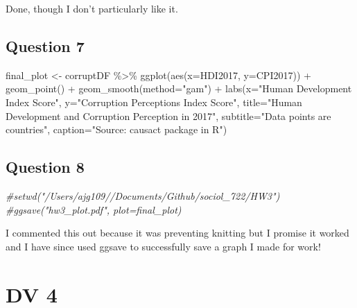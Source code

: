 \documentclass[
]{article}
\newenvironment{Shaded}{\begin{snugshade}}{\end{snugshade}}
\newcommand{\AttributeTok}[1]{\textcolor[rgb]{0.77,0.63,0.00}{#1}}
\newcommand{\CommentTok}[1]{\textcolor[rgb]{0.56,0.35,0.01}{\textit{#1}}}
\newcommand{\FunctionTok}[1]{\textcolor[rgb]{0.00,0.00,0.00}{#1}}
\newcommand{\NormalTok}[1]{#1}
\newcommand{\OtherTok}[1]{\textcolor[rgb]{0.56,0.35,0.01}{#1}}
\newcommand{\SpecialCharTok}[1]{\textcolor[rgb]{0.00,0.00,0.00}{#1}}
\newcommand{\StringTok}[1]{\textcolor[rgb]{0.31,0.60,0.02}{#1}}
\begin{document}
Done, though I don't particularly like it.

\hypertarget{question-7}{%
\subsection{Question 7}\label{question-7}}

\begin{Shaded}
\begin{Highlighting}[]
\NormalTok{final\_plot }\OtherTok{\textless{}{-}}\NormalTok{ corruptDF }\SpecialCharTok{\%\textgreater{}\%} 
  \FunctionTok{ggplot}\NormalTok{(}\FunctionTok{aes}\NormalTok{(}\AttributeTok{x=}\NormalTok{HDI2017,}
             \AttributeTok{y=}\NormalTok{CPI2017)) }\SpecialCharTok{+}
  \FunctionTok{geom\_point}\NormalTok{() }\SpecialCharTok{+}
  \FunctionTok{geom\_smooth}\NormalTok{(}\AttributeTok{method=}\StringTok{"gam"}\NormalTok{) }\SpecialCharTok{+}
  \FunctionTok{labs}\NormalTok{(}\AttributeTok{x=}\StringTok{"Human Development Index Score"}\NormalTok{,}
       \AttributeTok{y=}\StringTok{"Corruption Perceptions Index Score"}\NormalTok{,}
       \AttributeTok{title=}\StringTok{"Human Development and Corruption Perception in 2017"}\NormalTok{,}
       \AttributeTok{subtitle=}\StringTok{"Data points are countries"}\NormalTok{,}
       \AttributeTok{caption=}\StringTok{"Source: causact package in R"}\NormalTok{)}
\end{Highlighting}
\end{Shaded}

\hypertarget{question-8}{%
\subsection{Question 8}\label{question-8}}

\begin{Shaded}
\begin{Highlighting}[]
\CommentTok{\#setwd("/Users/ajg109//Documents/Github/sociol\_722/HW3")}
\CommentTok{\#ggsave("hw3\_plot.pdf", plot=final\_plot)}
\end{Highlighting}
\end{Shaded}

I commented this out because it was preventing knitting but I promise it
worked and I have since used ggsave to successfully save a graph I made
for work!

\hypertarget{dv-4}{%
\section{DV 4}\label{dv-4}}
\end{document}
